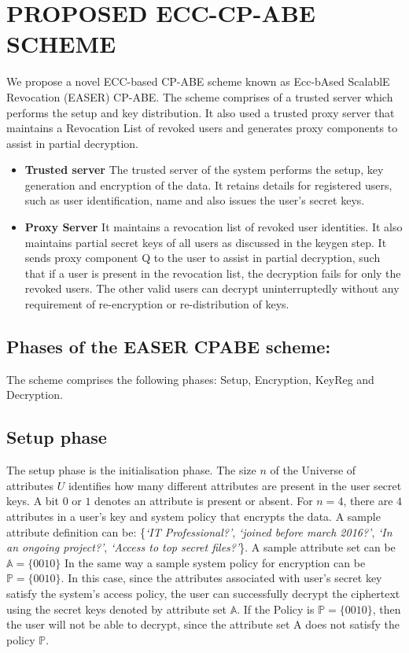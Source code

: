 \documentclass[conference]{IEEEtran}
\begin{document}
\section{\textbf{PROPOSED ECC-CP-ABE SCHEME}}

We propose a novel ECC-based CP-ABE scheme known as Ecc-bAsed ScalablE Revocation (EASER) CP-ABE. The scheme comprises of a trusted server which performs the setup and key distribution. It also used a trusted proxy server that maintains a Revocation List of revoked users and generates proxy components to assist in partial decryption.
\begin{itemize}
\item{\textbf{Trusted server }}
The trusted server of the system performs the setup, key generation and encryption of the data. It retains details for registered users, such as user identification, name and also issues the user's secret keys.

\item{\textbf{Proxy Server }}
It maintains a revocation list of revoked user identities.
It also maintains partial secret keys of all users as discussed in the keygen step. It sends proxy component Q to the user to assist in partial decryption, such that if a user is present in the revocation list, the decryption fails for only the revoked users. The other valid users can decrypt uninterruptedly without any requirement of re-encryption or re-distribution of keys.
\end{itemize}

\subsection{\textbf{Phases of the EASER CPABE scheme:}}
The scheme comprises the following phases: Setup, Encryption, KeyReg and Decryption.


\subsection{\textbf{Setup phase}}
The setup phase is the initialisation phase. The size $n$ of the Universe of attributes $U$ identifies how many different attributes are present in the user secret keys. A bit $0$ or $1$ denotes an attribute is present or absent.
For $n =4$, there are $4$ attributes in a user’s key and system policy that encrypts the data. A sample attribute definition can be: \{\emph{‘IT Professional?’}, \emph{‘joined before march 2016?’}, \emph{‘In an ongoing project?’}, \emph{‘Access to top secret files?’}\}. A sample attribute set can be $\mathbb{A}   = \{0 0 1 0\}$ In the same way a sample system policy for encryption can be $\mathbb{P}  = \{0 0 1 0\}$. In this case, since the attributes associated with user's secret key satisfy the system's access policy, the user can successfully decrypt the ciphertext using the secret keys denoted by attribute set $\mathbb{A}$. If the Policy is $\mathbb{P} = \{0 0 1 0\}$, then the user will not be able to decrypt, since the attribute set A does not satisfy the policy $\mathbb{P}$.
\end{document}
